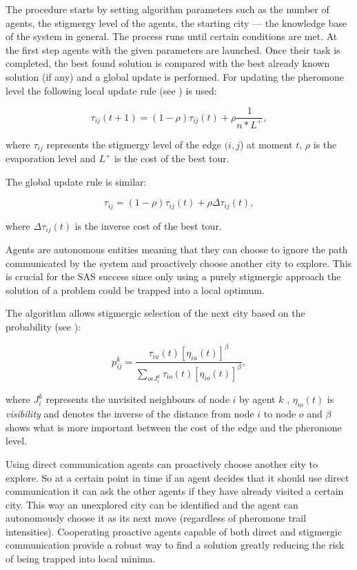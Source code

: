 The procedure starts by setting algorithm parameters such as the number of agents, the stigmergy level of the agents, the starting city --- the knowledge base of the system in general. The process runs until certain conditions are met. At the first step agents with the given parameters are launched. Once their task is completed, the best found solution is compared with the best already known solution (if any) and a global update is performed. For updating the pheromone level  the following local update rule (see \cite{cmpintea06}) is used:
    
    \begin{equation}
\tau _{ij}(t+1)=(1-\rho )\tau _{ij}(t)+\rho \frac{1}{n\ast L^{+}},
\end{equation}

where $\tau _{ij}$ represents the stigmergy level of the edge
$(i,j$) at moment $t$,  $\rho $ is the evaporation level and $L^{+}$
is the cost of the best tour.

\qquad The global update rule is similar:

\begin{equation}
\tau _{ij}=(1-\rho )\tau _{ij}(t)+\rho \Delta \tau _{ij}(t),
\end{equation}

where $\Delta \tau _{ij}(t)$ is the inverse cost of the best tour.

Agents are autonomous entities meaning that they can choose
to ignore the path communicated by the system and proactively choose
another city to explore. This is crucial for the SAS success since
only using a purely stigmergic approach the solution of a problem
could be trapped into a local optimum.

The algorithm allows stigmergic selection of the next city based on
the probability (see \cite{cmpintea06}):

\begin{equation}
p_{ij}^{k}=\frac{\tau _{iu}(t)[\eta _{iu}(t)]^{\beta }}{\sum_{o\epsilon J_{i%
}^{k}}\tau _{io}(t)[\eta _{io}(t)]^{\beta }},
\end{equation}

where $J_{i}^{k}$ represents the unvisited neighbours of node $i$ by agent $k$%
, $\eta _{io}(t)$ is \emph{visibility} and denotes the inverse of
the distance from node $i$ to node $o$ and $\beta $ shows what is
more important between the cost of the edge and the pheromone level.

Using direct communication agents can proactively choose another
city to explore. So at a certain point in time if an agent decides
that it should use direct communication it can ask the other agents
if they have already visited a certain city. This way an unexplored
city can be identified and the agent can autonomously choose it as
its next move (regardless of pheromone trail intensities).
Cooperating proactive agents capable of both direct and stigmergic
communication provide a robust way to find a solution greatly
reducing the risk of being trapped into local minima.

